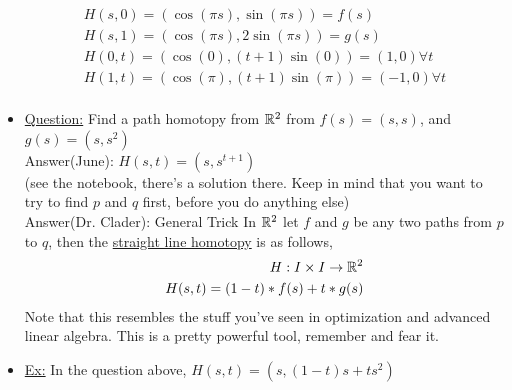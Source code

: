 \begin{itemize}
\begin{align*}
                H(s,0)=(\cos(\pi s), \sin(\pi s))=f(s)\\
                H(s,1)=(\cos(\pi s), 2\sin(\pi s))=g(s)\\
                H(0,t)=(\cos(0), (t+1)\sin(0))=(1,0)\forall t\\
                H(1,t)=(\cos(\pi), (t+1)\sin(\pi))=(-1,0)\forall t\\
            \end{align*}
        \item \underline{Question:} Find a path homotopy from $\mathbb{R}^2$ from $f(s)=(s,s)$, and $g(s)=(s,s^2)$\\
            Answer(June): $H(s,t)=(s,s^{t+1})$\\
            (see the notebook, there's a solution there. Keep in mind that you want to try to find $p$ and $q$ first, before you do anything else)\\
            Answer(Dr. Clader): General Trick In $\mathbb{R}^2$ let $f$ and $g$ be any two paths from $p$ to $q$, then the
            \underline{straight line homotopy} is as follows,
            \begin{align*}
                H: I \times I \rightarrow \mathbb{R}^2\\
                H(s,t)=(1-t)*f(s)+t*g(s)\\
            \end{align*}
            Note that this resembles the stuff you've seen in optimization and advanced linear algebra. This is a pretty powerful tool,
            remember and fear it.
        \item \underline{Ex:} In the question above, $H(s, t)=(s, (1-t)s+ts^2)$
    \end{itemize}
